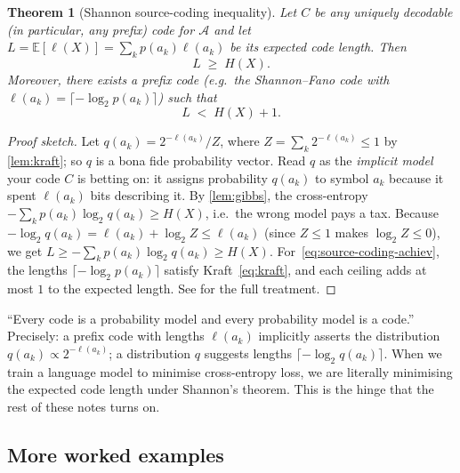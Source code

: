 \documentclass[12pt,a4paper]{article}
\theoremstyle{plain}
\newtheorem{theorem}{Theorem}[section]
\theoremstyle{definition}
\begin{document}
\begin{theorem}[Shannon source-coding inequality]
\label{thm:source-coding}
Let $C$ be any uniquely decodable (in particular, any prefix) code
for $\mathcal{A}$ and let $L = \mathbb{E}[\ell(X)] =
\sum_k p(a_k)\ell(a_k)$ be its expected code length. Then
\begin{equation}
  L \;\ge\; H(X).
  \label{eq:source-coding}
\end{equation}
Moreover, there exists a prefix code (e.g.\ the Shannon--Fano code
with $\ell(a_k) = \lceil -\log_2 p(a_k)\rceil$) such that
\begin{equation}
  L \;<\; H(X) + 1.
  \label{eq:source-coding-achiev}
\end{equation}
\end{theorem}

\begin{proof}[Proof sketch]
Let $q(a_k) = 2^{-\ell(a_k)} / Z$, where
$Z = \sum_k 2^{-\ell(a_k)} \le 1$ by \cref{lem:kraft}; so $q$ is a
bona fide probability vector. Read $q$ as the \emph{implicit model}
your code $C$ is betting on: it assigns probability $q(a_k)$ to
symbol $a_k$ because it spent $\ell(a_k)$ bits describing it. By
\cref{lem:gibbs}, the cross-entropy $-\sum_k p(a_k) \log_2 q(a_k)
\ge H(X)$, i.e.\ the wrong model pays a tax. Because
$-\log_2 q(a_k) = \ell(a_k) + \log_2 Z \le \ell(a_k)$ (since $Z \le
1$ makes $\log_2 Z \le 0$), we get $L \ge -\sum_k p(a_k)\log_2
q(a_k) \ge H(X)$. For~\eqref{eq:source-coding-achiev}, the lengths
$\lceil -\log_2 p(a_k)\rceil$ satisfy Kraft~\eqref{eq:kraft}, and
each ceiling adds at most $1$ to the expected length. See
\citet[Ch.~5]{coverthomas2006} for the full treatment.
\end{proof}

\begin{aside}[title={The slogan, properly qualified}]
``Every code is a probability model and every probability model is a
code.'' Precisely: a prefix code with lengths $\ell(a_k)$ implicitly
asserts the distribution $q(a_k) \propto 2^{-\ell(a_k)}$; a
distribution $q$ suggests lengths $\lceil -\log_2 q(a_k)\rceil$.
When we train a language model to minimise cross-entropy loss, we
are literally minimising the expected code length under Shannon's
theorem. This is the hinge that the rest of these notes turns on.
\end{aside}

\subsection*{More worked examples}
\end{document}
